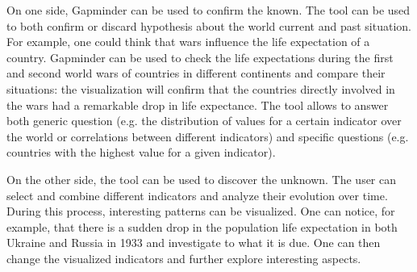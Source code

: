 On one side, Gapminder can be used to confirm the known.
The tool can be used to both confirm or discard hypothesis about the world current and past situation.
For example, one could think that wars influence the life expectation of a country.
Gapminder can be used to check the life expectations during the first and second world wars of countries in different continents and compare their situations:
the visualization will confirm that the countries directly involved in the wars had a remarkable drop in life expectance.
The tool allows to answer both generic question (e.g. the distribution of values for a certain indicator over the world or correlations between different indicators) and specific questions (e.g. countries with the highest value for a given indicator).

On the other side, the tool can be used to discover the unknown.
The user can select and combine different indicators and analyze their evolution over time.
During this process, interesting patterns can be visualized.
One can notice, for example, that there is a sudden drop in the population life expectation in both Ukraine and Russia in 1933 and investigate to what it is due.
One can then change the visualized indicators and further explore interesting aspects.
